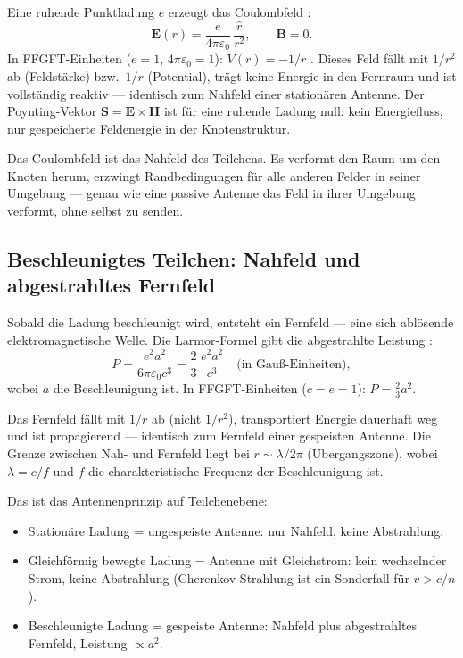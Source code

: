 Eine ruhende Punktladung $e$ erzeugt das Coulombfeld \EM:
\[
  \mathbf{E}(r) = \frac{e}{4\pi\varepsilon_0}\,\frac{\hat{r}}{r^2},
  \qquad
  \mathbf{B} = 0.
\]
In FFGFT-Einheiten ($e=1$, $4\pi\varepsilon_0=1$): $V(r) = -1/r$ \cite{PascherDok365}.
Dieses Feld fällt mit $1/r^2$ ab (Feldstärke) bzw.\ $1/r$ (Potential),
trägt keine Energie in den Fernraum und ist vollständig reaktiv ---
identisch zum Nahfeld einer stationären Antenne. Der Poynting-Vektor
$\mathbf{S} = \mathbf{E}\times\mathbf{H}$ ist für eine ruhende Ladung
null: kein Energiefluss, nur gespeicherte Feldenergie in der Knotenstruktur.

Das Coulombfeld ist das Nahfeld des Teilchens. Es verformt den Raum
um den Knoten herum, erzwingt Randbedingungen für alle anderen Felder
in seiner Umgebung --- genau wie eine passive Antenne das Feld in
ihrer Umgebung verformt, ohne selbst zu senden.

\subsection*{Beschleunigtes Teilchen: Nahfeld und abgestrahltes Fernfeld}

Sobald die Ladung beschleunigt wird, entsteht ein Fernfeld --- eine
sich ablösende elektromagnetische Welle. Die Larmor-Formel gibt die
abgestrahlte Leistung \cite{Jackson1999,Griffiths1999}:
\[
  P = \frac{e^2 a^2}{6\pi\varepsilon_0 c^3}
    = \frac{2}{3}\,\frac{e^2 a^2}{c^3}
  \quad \text{(in Gauß-Einheiten)},
\]
wobei $a$ die Beschleunigung ist. In FFGFT-Einheiten ($c=e=1$):
$P = \frac{2}{3}a^2$.

Das Fernfeld fällt mit $1/r$ ab (nicht $1/r^2$), transportiert Energie
dauerhaft weg und ist propagierend --- identisch zum Fernfeld einer
gespeisten Antenne. Die Grenze zwischen Nah- und Fernfeld liegt bei
$r \sim \lambda/2\pi$ (Übergangszone), wobei $\lambda = c/f$ und $f$
die charakteristische Frequenz der Beschleunigung ist.

Das ist das Antennenprinzip auf Teilchenebene:
\begin{itemize}[nosep]
  \item Stationäre Ladung = ungespeiste Antenne: nur Nahfeld,
    keine Abstrahlung.
  \item Gleichförmig bewegte Ladung = Antenne mit Gleichstrom:
    kein wechselnder Strom, keine Abstrahlung (Cherenkov-Strahlung
    ist ein Sonderfall für $v > c/n$).
  \item Beschleunigte Ladung = gespeiste Antenne: Nahfeld plus
    abgestrahltes Fernfeld, Leistung $\propto a^2$.
\end{itemize}

